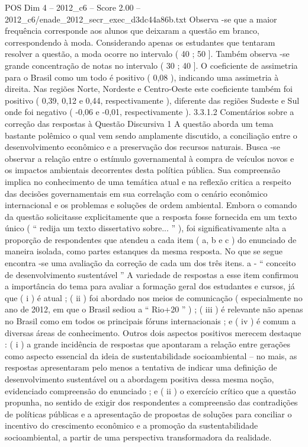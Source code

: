 \begin{textsample}{POS Dim 4 – 2012\_c6 – Score 2.00 – 2012\_c6/enade\_2012\_secr\_exec\_d3dc44a86b.txt}
Observa -se que a maior frequência corresponde aos alunos que deixaram a questão em branco, correspondendo à moda.
Considerando apenas os estudantes que tentaram resolver a questão, a moda ocorre no intervalo ( 40 ; 50 ].
Também observa -se grande concentração de notas no intervalo ( 30 ; 40 ].
O coeficiente de assimetria para o Brasil como um todo é positivo ( 0,08 ), indicando uma assimetria à direita.
Nas regiões Norte, Nordeste e Centro-Oeste este coeficiente também foi positivo ( 0,39, 0,12 e 0,44, respectivamente ), diferente das regiões Sudeste e Sul onde foi negativo ( -0,06 e -0,01, respectivamente ). 3.3.1.2 Comentários sobre a correção das respostas à Questão Discursiva 1 A questão aborda um tema bastante polêmico o qual vem sendo amplamente discutido, a conciliação entre o desenvolvimento econômico e a preservação dos recursos naturais.
Busca -se observar a relação entre o estímulo governamental à compra de veículos novos e os impactos ambientais decorrentes desta política pública.
Sua compreensão implica no conhecimento de uma temática atual e na reflexão critica a respeito das decisões governamentais em sua correlação com o cenário econômico internacional e os problemas e soluções de ordem ambiental.
Embora o comando da questão solicitasse explicitamente que a resposta fosse fornecida em um texto único ( “ redija um texto dissertativo sobre... ” ), foi significativamente alta a proporção de respondentes que atendeu a cada item ( a, b e c ) do enunciado de maneira isolada, como partes estanques da mesma resposta.
No que se segue encontra -se uma avaliação da correção de cada um dos três itens. a - “ conceito de desenvolvimento sustentável ” A variedade de respostas a esse item confirmou a importância do tema para avaliar a formação geral dos estudantes e cursos, já que ( i ) é atual ; ( ii ) foi abordado nos meios de comunicação ( especialmente no ano de 2012, em que o Brasil sediou a “ Rio+20 ” ) ; ( iii ) é relevante não apenas no Brasil como em todos os principais fóruns internacionais ; e ( iv ) é comum a diversas áreas de conhecimento.
Outros dois aspectos positivos merecem destaque : ( i ) a grande incidência de respostas que apontaram a relação entre gerações como aspecto essencial da ideia de sustentabilidade socioambiental – no mais, as respostas apresentaram pelo menos a tentativa de indicar uma definição de desenvolvimento sustentável ou a abordagem positiva dessa mesma noção, evidenciado compreensão do enunciado ; e ( ii ) o exercício crítico que a questão propunha, no sentido de exigir dos respondentes a compreensão das contradições de políticas públicas e a apresentação de propostas de soluções para conciliar o incentivo do crescimento econômico e a promoção da sustentabilidade socioambiental, a partir de uma perspectiva transformadora da realidade.

\end{textsample}
